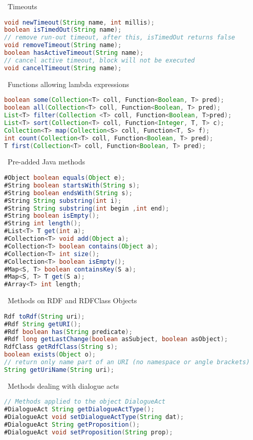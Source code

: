 \documentclass[5pt]{article}
\newcommand{\intitle}[1]{\rule{0pt}{2ex}\ #1}
\begin{document}
\begin{multicols}{2}
\begin{bodybox}{}
        \intitle{Timeouts}
        \begin{lstlisting}[language=Java]
void newTimeout(String name, int millis);
boolean isTimedOut(String name);
// remove run-out timeout, after this, isTimedOut returns false
void removeTimeout(String name);
boolean hasActiveTimeout(String name);
// cancel active timeout, block will not be executed
void cancelTimeout(String name);
        \end{lstlisting}
        \intitle{Functions allowing lambda expressions}
        \begin{lstlisting}[language=Java]
boolean some(Collection<T> coll, Function<Boolean, T> pred);
boolean all(Collection<T> coll, Function<Boolean, T> pred);
List<T> filter(Collection <T> coll, Function<Boolean, T>pred);
List<T> sort(Collection<T> coll, Function<Integer, T, T> c);
Collection<T> map(Collection<S> coll, Function<T, S> f);
int count(Collection<T> coll, Function<Boolean, T> pred);
T first(Collection<T> coll, Function<Boolean, T> pred);
        \end{lstlisting}
        \intitle{Pre-added Java methods}
        \begin{lstlisting}[language=Java]
#Object boolean equals(Object e);
#String boolean startsWith(String s);
#String boolean endsWith(String s);
#String String substring(int i);
#String String substring(int begin ,int end);
#String boolean isEmpty();
#String int length();
#List<T> T get(int a);
#Collection<T> void add(Object a);
#Collection<T> boolean contains(Object a);
#Collection<T> int size();
#Collection<T> boolean isEmpty();
#Map<S, T> boolean containsKey(S a);
#Map<S, T> T get(S a);
#Array<T> int length;
        \end{lstlisting}
        \intitle{Methods on RDF and RDFClass Objects}
        \begin{lstlisting}[language=Java]
Rdf toRdf(String uri);
#Rdf String getURI();
#Rdf boolean has(String predicate);
#Rdf long getLastChange(boolean asSubject, boolean asObject);
RdfClass getRdfClass(String s);
boolean exists(Object o);
// return only name part of an URI (no namespace or angle brackets)
String getUriName(String uri);
        \end{lstlisting}
        \intitle{Methods dealing with dialogue acts}
        \begin{lstlisting}[language=Java]
// Methods applied to the object DialogueAct
#DialogueAct String getDialogueActType();
#DialogueAct void setDialogueActType(String dat);
#DialogueAct String getProposition();
#DialogueAct void setProposition(String prop);

\end{lstlisting}
\end{bodybox}
\end{multicols}
\end{document}

